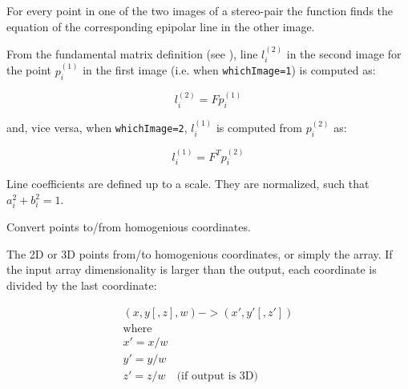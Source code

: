 For every point in one of the two images of a stereo-pair the function finds the equation of the
corresponding epipolar line in the other image.

From the fundamental matrix definition (see ),
line $l^{(2)}_i$ in the second image for the point $p^{(1)}_i$ in the first image (i.e. when \texttt{whichImage=1}) is computed as:

\[ l^{(2)}_i = F p^{(1)}_i \]

and, vice versa, when \texttt{whichImage=2}, $l^{(1)}_i$ is computed from $p^{(2)}_i$ as:

\[ l^{(1)}_i = F^T p^{(2)}_i \]

Line coefficients are defined up to a scale. They are normalized, such that $a_i^2+b_i^2=1$.


\ifPy
\else

Convert points to/from homogenious coordinates.



\begin{description}
\ifC
{}
\else
{}
\fi
\end{description}

The  2D or 3D points from/to homogenious coordinates, or simply  the array. If the input array dimensionality is larger than the output, each coordinate is divided by the last coordinate:

\[
\begin{array}{l}
(x,y[,z],w) -> (x',y'[,z'])\\
\text{where} \\
x' = x/w \\
y' = y/w \\
z' = z/w \quad \text{(if output is 3D)}
\end{array}
\]

